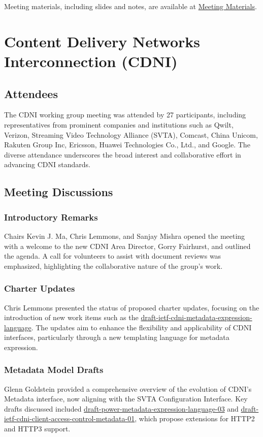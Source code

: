 \documentclass{article}
\begin{document}
Meeting materials, including slides and notes, are available at \href{https://datatracker.ietf.org/meeting/122/materials/agenda-122-ccwg}{Meeting Materials}.




\newpage

\section{Content Delivery Networks Interconnection (CDNI)}

\subsection{Attendees}
The CDNI working group meeting was attended by 27 participants, including representatives from prominent companies and institutions such as Qwilt, Verizon, Streaming Video Technology Alliance (SVTA), Comcast, China Unicom, Rakuten Group Inc, Ericsson, Huawei Technologies Co., Ltd., and Google. The diverse attendance underscores the broad interest and collaborative effort in advancing CDNI standards.

\subsection{Meeting Discussions}

\subsubsection{Introductory Remarks}
Chairs Kevin J. Ma, Chris Lemmons, and Sanjay Mishra opened the meeting with a welcome to the new CDNI Area Director, Gorry Fairhurst, and outlined the agenda. A call for volunteers to assist with document reviews was emphasized, highlighting the collaborative nature of the group's work.

\subsubsection{Charter Updates}
Chris Lemmons presented the status of proposed charter updates, focusing on the introduction of new work items such as the \href{https://datatracker.ietf.org/doc/html/draft-ietf-cdni-metadata-expression-language}{draft-ietf-cdni-metadata-expression-language}. The updates aim to enhance the flexibility and applicability of CDNI interfaces, particularly through a new templating language for metadata expression.

\subsubsection{Metadata Model Drafts}
Glenn Goldstein provided a comprehensive overview of the evolution of CDNI's Metadata interface, now aligning with the SVTA Configuration Interface. Key drafts discussed included \href{https://datatracker.ietf.org/doc/html/draft-power-metadata-expression-language-03}{draft-power-metadata-expression-language-03} and \href{https://datatracker.ietf.org/doc/html/draft-ietf-cdni-client-access-control-metadata-01}{draft-ietf-cdni-client-access-control-metadata-01}, which propose extensions for HTTP2 and HTTP3 support.
\end{document}
